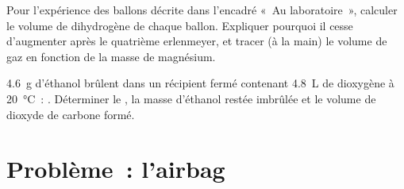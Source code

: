 \begin{exercise}[$\star\star\star$]\label{exo:g10:reaction-progress-table:14}
Pour l'expérience des ballons décrite dans l'encadré «~Au laboratoire~»,
calculer le volume de dihydrogène de chaque ballon. Expliquer pourquoi
il cesse d'augmenter après le quatrième erlenmeyer, et tracer (à la
main) le volume de gaz en fonction de la masse de magnésium.
\end{exercise}

\begin{exercise}[$\star\star\star$]\label{exo:g10:reaction-progress-table:15}
\qty{4.6}{g} d'éthanol  brûlent dans un récipient fermé
contenant \qty{4.8}{L} de dioxygène à \qty{20}{\celsius}~:
. Déterminer le , la masse
d'éthanol restée imbrûlée et le volume de dioxyde de carbone formé.
\end{exercise}

\section{Problème~: l'airbag}

